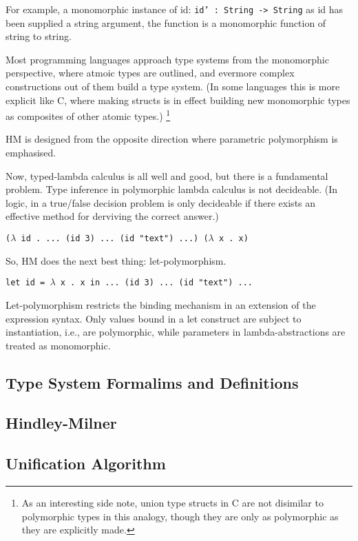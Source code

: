 \documentclass{l4proj}
\begin{document}
For example, a monomorphic instance of id: \texttt{id' : String -> String} as id has been supplied a string argument, the function is a monomorphic function of string to string.

Most programming languages approach type systems from the monomorphic perspective, where atmoic types are outlined, and evermore complex constructions out of them build a type system.
(In some languages this is more explicit like C, where making structs is in effect building new monomorphic types as composites of other atomic types.)
\footnote{As an interesting side note, union type structs in C are not disimilar to polymorphic types in this analogy, though they are only as polymorphic as they are explicitly made.}

HM is designed from the opposite direction where parametric polymorphism is emphasised.

Now, typed-lambda calculus is all well and good, but there is a fundamental problem. Type inference in polymorphic lambda calculus is not decideable. (In logic, in a true/false decision problem is only decideable if there exists an effective method for derviving the correct answer.)

\texttt{($\lambda$ id . ... (id 3) ... (id "text") ...) ($\lambda$ x . x)}

So, HM does the next best thing: let-polymorphism.

\texttt{let id = $\lambda$ x . x in ... (id 3) ... (id "text") ...}

Let-polymorphism restricts the binding mechanism in an extension of the expression syntax. Only values bound in a let construct are subject to instantiation, i.e., are polymorphic, while parameters in lambda-abstractions are treated as monomorphic.

\subsection{Type System Formalims and Definitions}

\subsection{Hindley-Milner}

\subsection{Unification Algorithm}
\end{document}
